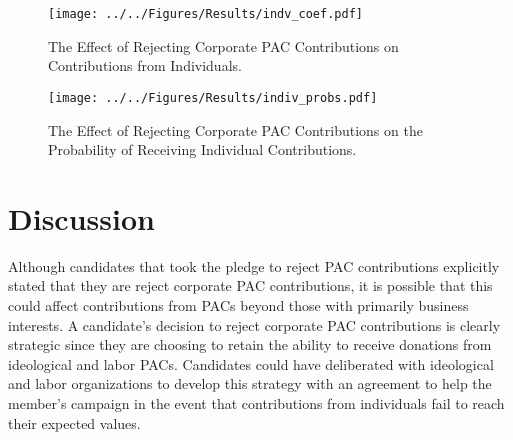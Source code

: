 \documentclass[12pt]{article}
\begin{document}
\begin{figure*}[h]
    \centering
    \begin{subfigure}[b]{0.75\textwidth}
        \centering
        \texttt{[image: ../../Figures/Results/indv\_coef.pdf]}
        \caption{The Effect of Rejecting Corporate PAC Contributions on Contributions from Individuals.}
        \label{fig: indiv coefs}
    \end{subfigure}
    
    \begin{subfigure}[b]{0.75\textwidth}
        \centering
        \texttt{[image: ../../Figures/Results/indiv\_probs.pdf]}
        \caption{The Effect of Rejecting Corporate PAC Contributions on the Probability of Receiving Individual Contributions.}
        \label{fig: indiv probs}
    \end{subfigure}
    \caption{\textbf{The Effect of Rejecting Corporate PAC Contributions on Contributions and the Probability of Receiving Money from Individuals.} These figures present the posterior distributions estimated for a candidate that pledges to reject corporate PAC contributions. The dot shows the median coefficient estimate and the intervals show the 50\% and 89\% highest density intervals. Figure \ref{fig: indiv coefs} shows that candidates that pledge to reject corporate PAC contributions experience an increase in contributions from small-dollar, total, ideological, large-dollar, and business individual contributions. Figure \ref{fig: indiv probs} shows that rejecting corporate PAC contributions has no effect on the probability of receiving contributions from individuals affiliated with labor or ideological interest groups. See Table \ref{tbl: pac results} for the formal estimates.}
    \label{fig: indiv results}
\end{figure*}


\section{Discussion} \label{sec: discussion}

 Although candidates that took the pledge to reject PAC contributions explicitly stated that they are reject corporate PAC contributions, it is possible that this could affect contributions from PACs beyond those with primarily business interests. A candidate's decision to reject corporate PAC contributions is clearly strategic since they are choosing to retain the ability to receive donations from ideological and labor PACs. Candidates could have deliberated with ideological and labor organizations to develop this strategy with an agreement to help the member's campaign in the event that contributions from individuals fail to reach their expected values. 
\end{document}
